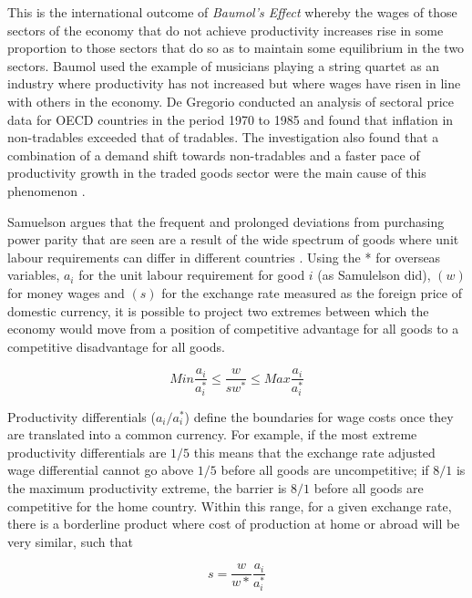 \documentclass[12pt, a4paper, oneside]{article}\usepackage[]{graphicx}\usepackage[]{color}
\begin{document}
This is the international outcome of \emph{Baumol's Effect} \citep{Baumol1966Performing} whereby the wages of those sectors of the economy that do not achieve productivity increases rise in some proportion to those sectors that do so as to maintain some equilibrium in the two sectors.   Baumol used the example of musicians playing a string quartet as an industry where productivity has not increased but where wages have risen in line with others in the economy.   De Gregorio conducted an analysis of sectoral price data for OECD countries in the period 1970 to 1985 and found that inflation in non-tradables exceeded that of tradables.  The investigation also found that a combination of a demand shift towards non-tradables and a faster pace of productivity growth in the traded goods sector were the main cause of this phenomenon \citep{DeGregorio1994International}. 


Samuelson argues that the frequent and prolonged deviations from purchasing power parity that are seen are a result of the wide spectrum of goods where unit labour requirements can differ in different countries  \citep{samuelson1964trade}.  Using the * for overseas variables, $a_i$ for the unit labour requirement for good $i$ (as Samulelson did), $(w)$ for money wages and $(s)$ for the exchange rate measured as the foreign price of domestic currency, it is possible to project two extremes between which the economy would move from a position of competitive advantage for all goods to a competitive disadvantage for all goods. 

\begin{equation}\label{samuelson}
Min\frac{a_i}{a_i^*} \leq \frac{w}{sw^*} \leq Max\frac{a_i}{a_i^*}
\end{equation}

Productivity differentials ($a_i/a^*_i$) define the boundaries for wage costs once they are translated into a common currency.  For example, if the most extreme productivity differentials are $1/5$ this means that the exchange rate adjusted wage differential cannot go above $1/5$ before all goods are uncompetitive; if $8/1$ is the maximum productivity extreme, the barrier is $8/1$ before all goods are competitive for the home country.  Within this range, for a given exchange rate, there is a borderline product where cost of production at home or abroad will be very similar, such that 

\begin{equation}
s=\frac{w}{w*}\frac{a_i}{a_i^*}
\end{equation}
\end{document}
